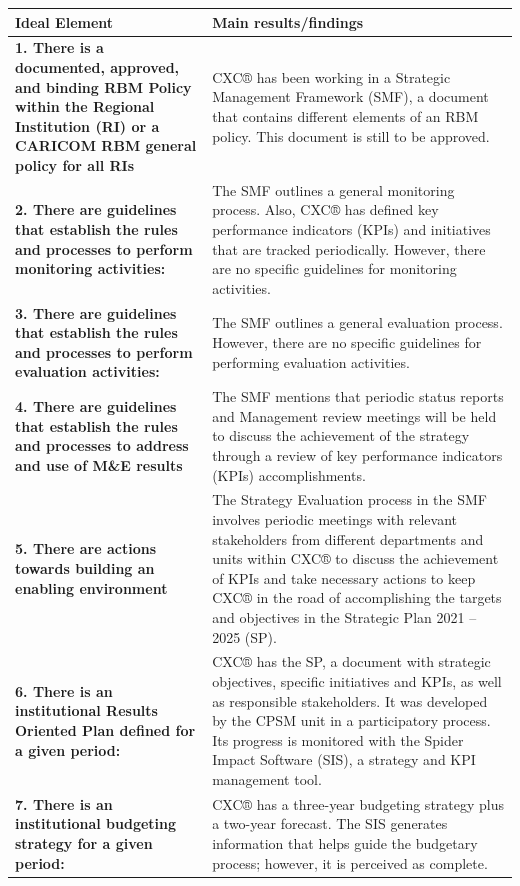 \documentclass[
  10pt,
]{book}
\begin{document}
\begingroup\fontsize{12}{14}\selectfont

\begin{tabu} to 
\hline
Ideal Element & Main results/findings\\
\hline
\textbf{1. There is a documented, approved, and binding RBM Policy within the Regional Institution (RI) or a CARICOM RBM general policy for all RIs} & CXC® has been working in a Strategic Management Framework (SMF), a document that contains different elements of an RBM policy. This document is still to be approved.\\
\hline
\textbf{2. There are guidelines that establish the rules and processes to perform monitoring activities:} & The SMF outlines a general monitoring process. Also, CXC® has defined key performance indicators (KPIs) and initiatives that are tracked periodically. However, there are no specific guidelines for monitoring activities.\\
\hline
\textbf{3. There are guidelines that establish the rules and processes to perform evaluation activities:} & The SMF outlines a general evaluation process. However, there are no specific guidelines for performing evaluation activities.\\
\hline
\textbf{4. There are guidelines that establish the rules and processes to address and use of M\&E results} & The SMF mentions that periodic status reports and Management review meetings will be held to discuss the achievement of the strategy through a review of key performance indicators (KPIs) accomplishments.\\
\hline
\textbf{5. There are actions towards building an enabling environment} & The Strategy Evaluation process in the SMF involves periodic meetings with relevant stakeholders from different departments and units within CXC® to discuss the achievement of KPIs and take necessary actions to keep CXC® in the road of accomplishing the targets and objectives in the Strategic Plan 2021 – 2025 (SP).\\
\hline
\textbf{6. There is an institutional Results Oriented Plan defined for a given period:} & CXC® has the SP, a document with strategic objectives, specific initiatives and KPIs, as well as responsible stakeholders. It was developed by the CPSM unit in a participatory process. Its progress is monitored with the  Spider Impact Software (SIS), a strategy and KPI management tool.\\
\hline
\textbf{7. There is an institutional budgeting strategy for a given period:} & CXC® has a three-year budgeting strategy plus a two-year forecast. The SIS generates information that helps guide the budgetary process; however, it is perceived as complete.\\

\end{tabu}
\end{document}
